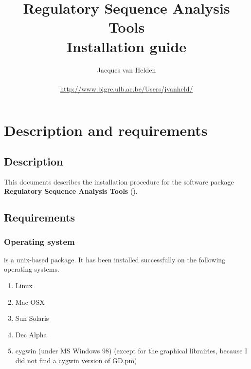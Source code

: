 \documentclass{book}
\begin{document}
\title{Regulatory Sequence Analysis Tools \\
Installation guide}

\author{
	Jacques van Helden \\
	 \\
	\url{http://www.bigre.ulb.ac.be/Users/jvanheld/} \\
	\bigre
}


\maketitle

\newpage
\tableofcontents
\newpage

\chapter{Description and requirements}

\section{Description}

This documents describes the installation procedure for the software
package \textbf{Regulatory Sequence Analysis Tools} (\RSAT).

\section{Requirements}

\subsection{Operating system}

\RSAT is a unix-based package. It has been installed successfully on
the following operating systems.

\begin{enumerate}
\item Linux

\item Mac OSX

\item Sun Solaris

\item Dec Alpha

\item cygwin (under MS Windows 98) (except for the graphical
librairies, because I did not find a cygwin version of GD.pm)

\end{enumerate}
\end{document}
